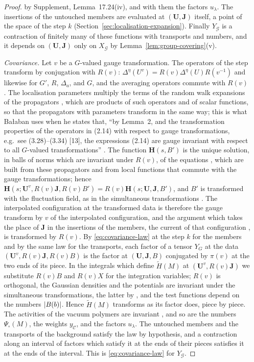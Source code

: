 \documentclass[11pt]{preprint}
\DeclarePairedDelimiter{\abs}{\lvert}{\rvert}
\numberwithin{equation}{section}
\theoremstyle{definition}
\theoremstyle{remark}
\theoremstyle{plain}
\begin{document}
\begin{proof}
by Supplement, Lemma~17.24(iv), and with them the factors $u_\lambda$. The insertions of the untouched members are evaluated at $(\mathbf U, \mathbf J)$ itself, a point of the space of the step $k$ (Section~\ref{sec:localisation-expansion}). Finally $Y_{\mathcal G}$ is a contraction of finitely many of these functions with transports and numbers, and it depends on $(\mathbf U, \mathbf J)$ only on $X_{\mathcal G}$ by Lemma~\ref{lem:group-covering}(v).

\emph{Covariance.} Let $v$ be a $G$-valued gauge transformation. The operators of the step transform by conjugation with $R(v)$: $\Delta^\eta(U^v) = R(v)\Delta^\eta(U)R(v^{-1})$ and likewise for $G'$, $R$, $\Delta_a$, and $G$, and the averaging operators commute with $R(v)$ \cite[(3.30)--(3.34), pp.~395--396]{BalabanPBG}. The localisation parameters multiply the terms of the random walk expansions of the propagators \cite[p.~3]{BalabanRG2}, which are products of such operators and of scalar functions, so that the propagators with parameters transform in the same way; this is what Ba{\l}aban uses when he states that, ``by Lemma~2, and the transformation properties of the operators in (2.14) with respect to gauge transformations, e.g.\ see (3.28)--(3.34) [13], the expressions (2.14) are gauge invariant with respect to all $G$-valued transformations'' \cite[p.~21]{BalabanRG2}. The function $\mathbf H(s, B')$ is the unique solution, in balls of norms which are invariant under $R(v)$, of the equations \cite[(1.3), (1.4), p.~2]{BalabanRG2}, which are built from these propagators and from local functions that commute with the gauge transformations; hence $\mathbf H(s; \mathbf U^v, R(v)\mathbf J, R(v)B') = R(v)\mathbf H(s; \mathbf U, \mathbf J, B')$, and $B'$ is transformed with the fluctuation field, as in the simultaneous transformations \cite[(3.29), p.~276]{BalabanRG1}. The interpolated configuration at the transformed data is therefore the gauge transform by $v$ of the interpolated configuration, and the argument which takes the place of $\mathbf J$ in the insertions of the members, the current of that configuration \cite[(3.10), p.~272]{BalabanRG1}, is transformed by $R(v)$. By \eqref{eq:covariance-law} at the step $k$ for the members and by the same law for the transports, each factor of a tensor $Y_G$ at the data $(\mathbf U^v, R(v)\mathbf J, R(v)B)$ is the factor at $(\mathbf U, \mathbf J, B)$ conjugated by $\pi(v)$ at the two ends of its piece. In the integrals which define $\tilde H(M)$ at $(\mathbf U^v, R(v)\mathbf J)$ we substitute $R(v)B$ and $R(v)X$ for the integration variables; $R(v)$ is orthogonal, the Gaussian densities and the potentials are invariant under the simultaneous transformations, the latter by \cite[Lemma~2, p.~11]{BalabanRG2}, and the test functions depend on the numbers $\abs{B(b)}$. Hence $\tilde H(M)$ transforms as its factor does, piece by piece. The activities of the vacuum polymers are invariant \cite[p.~21]{BalabanRG2}, and so are the numbers $\Psi_\circ(M)$, the weights $y_{\mathcal C}$, and the factors $u_\lambda$. The untouched members and the transports of the background satisfy the law by hypothesis, and a contraction along an interval of factors which satisfy it at the ends of their pieces satisfies it at the ends of the interval. This is \eqref{eq:covariance-law} for $Y_{\mathcal G}$.

\end{proof}
\end{document}
